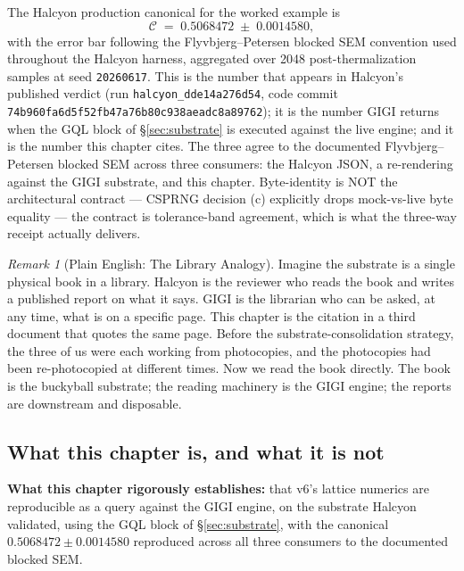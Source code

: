 \documentclass[12pt,a4paper]{article}
\theoremstyle{plain}
\theoremstyle{definition}
\theoremstyle{remark}
\newtheorem{remark}[theorem]{Remark}
\begin{document}
The Halcyon production canonical for the worked example is
\[
  \mathcal{C} \;=\; 0.5068472 \;\pm\; 0.0014580,
\]
with the error bar following the Flyvbjerg--Petersen blocked SEM convention used throughout the Halcyon harness, aggregated over 2048 post-thermalization samples at seed \texttt{20260617}. This is the number that appears in Halcyon's published verdict (run \texttt{halcyon\_dde14a276d54}, code commit \texttt{74b960fa6d5f52fb47a76b80c938aeadc8a89762}); it is the number GIGI returns when the GQL block of \S\ref{sec:substrate} is executed against the live engine; and it is the number this chapter cites. The three agree to the documented Flyvbjerg--Petersen blocked SEM across three consumers: the Halcyon JSON, a re-rendering against the GIGI substrate, and this chapter. Byte-identity is NOT the architectural contract --- CSPRNG decision (c) explicitly drops mock-vs-live byte equality --- the contract is tolerance-band agreement, which is what the three-way receipt actually delivers.

\begin{remark}[Plain English: The Library Analogy]
Imagine the substrate is a single physical book in a library. Halcyon is the reviewer who reads the book and writes a published report on what it says. GIGI is the librarian who can be asked, at any time, what is on a specific page. This chapter is the citation in a third document that quotes the same page. Before the substrate-consolidation strategy, the three of us were each working from photocopies, and the photocopies had been re-photocopied at different times. Now we read the book directly. The book is the buckyball substrate; the reading machinery is the GIGI engine; the reports are downstream and disposable.
\end{remark}

\subsection{What this chapter is, and what it is not}

\textbf{What this chapter rigorously establishes:} that v6's lattice numerics are reproducible as a query against the GIGI engine, on the substrate Halcyon validated, using the GQL block of \S\ref{sec:substrate}, with the canonical $0.5068472 \pm 0.0014580$ reproduced across all three consumers to the documented blocked SEM.
\end{document}
